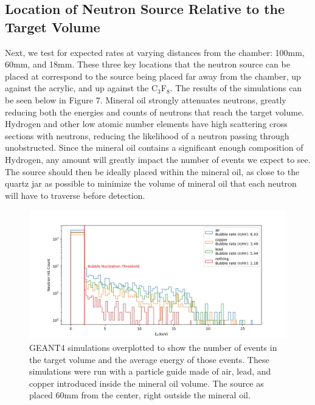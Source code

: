 \documentclass[%
12pt,
twoside,
reprint,
amsmath,amssymb,
aps,
]{article}
\begin{document}
	\subsection{Location of Neutron Source Relative to the Target Volume}
	\par Next, we test for expected rates at varying distances from the chamber: 100mm, 60mm, and 18mm. These three key locations that the neutron source can be placed at correspond to the source being placed far away from the chamber, up against the acrylic, and up against the C$_{3}$F$_{8}$. The results of the simulations can be seen below in Figure 7. Mineral oil strongly attenuates neutrons, greatly reducing both the energies and counts of neutrons that reach the target volume. Hydrogen and other low atomic number elements have high scattering cross sections with neutrons, reducing the likelihood of a neutron passing through unobstructed. Since the mineral oil contains a significant enough composition of Hydrogen, any amount will greatly impact the number of events we expect to see. The source should then be ideally placed within the mineral oil, as close to the quartz jar as possible to minimize the volume of mineral oil that each neutron will have to traverse before detection.
	
	\begin{figure}[!b]
		\includegraphics[scale = 0.6, center]{Images/particle_guide_log.png}
		\caption{\label{tab:table-name} GEANT4 simulations overplotted to show the number of events in the target volume and the average energy of those events. These simulations were run with a particle guide made of air, lead, and copper introduced inside the mineral oil volume. The source as placed 60mm from the center, right outside the mineral oil.}
	\end{figure}
	
\end{document}

